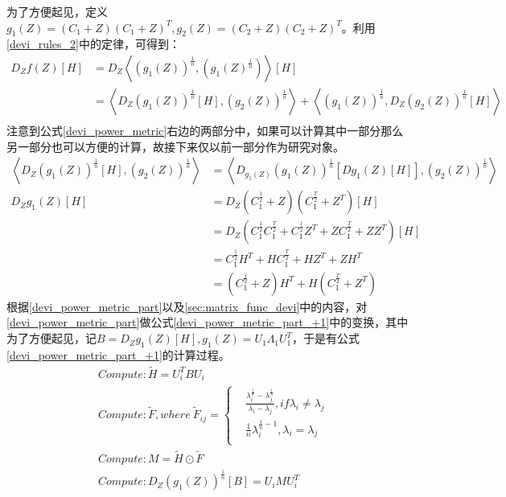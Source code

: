 为了方便起见，定义$g_{1}(Z)=(C_1+Z)(C_1+Z)^{T},g_{2}(Z)=(C_2+Z)(C_2+Z)^{T}$。利用\ref{devi_rules_2}中的定律，可得到：
\begin{equation}
\label{devi_power_metric}
\begin{split}
D_{Z}f(Z)[H]&=D_{Z}\left<\left(g_{1}(Z)\right)^{\frac{1}{n}},\left(g_{1}(Z)^{\frac{1}{n}}\right)\right>[H]\\
&=\left<D_{Z}\left(g_{1}(Z)\right)^{\frac{1}{n}}[H],\left(g_{2}(Z)\right)^{\frac{1}{n}}\right>+\left<\left(g_{1}(Z)\right)^{\frac{1}{n}},D_{Z}\left(g_{2}(Z)\right)^{\frac{1}{n}}[H]\right>\\
\end{split}
\end{equation}
注意到公式\ref{devi_power_metric}右边的两部分中，如果可以计算其中一部分那么另一部分也可以方便的计算，故接下来仅以前一部分作为研究对象。
\begin{equation}
\label{devi_power_metric_part}
\begin{split}
\left<D_{Z}\left(g_{1}(Z)\right)^{\frac{1}{n}}[H],\left(g_{2}(Z)\right)^{\frac{1}{n}}\right>&=\left<D_{g_{1}(Z)}\left(g_{1}(Z)\right)^{\frac{1}{n}}[Dg_{1}(Z)[H]],\left(g_{2}(Z)\right)^{\frac{1}{n}}\right>\\
D_{Z}g_{1}(Z)[H]&=D_{Z}(C_{1}^{\frac{1}{2}}+Z)(C_{1}^{\frac{T}{2}}+Z^{T})[H]\\
&=D_{Z}(C_{1}^{\frac{1}{2}}C_{1}^{\frac{T}{2}}+C_{1}^{\frac{1}{2}}Z^{T}+ZC_{1}^{\frac{T}{2}}+ZZ^{T})[H]\\
&=C_{1}^{\frac{1}{2}}H^{T}+HC_{1}^{\frac{T}{2}}+HZ^{T}+ZH^{T}\\
&=(C_{1}^{\frac{1}{2}}+Z)H^{T}+H(C_{1}^{\frac{T}{2}}+Z^{T})
\end{split}
\end{equation}
根据\ref{devi_power_metric_part}以及\ref{sec:matrix_func_devi}中的内容，对\ref{devi_power_metric_part}做公式\ref{devi_power_metric_part_+1}中的变换，其中为了方便起见，记$B=D_{Z}g_{1}(Z)[H],g_{1}(Z)=U_{1}\Lambda_{1}U_{1}^{T}$，于是有公式\ref{devi_power_metric_part_+1}的计算过程。
\begin{equation}
\label{devi_power_metric_part_+1}
\begin{split}
&Compute:\tilde{H}=U_{i}^{T}BU_{i}\\
&Compute:\tilde{F},where~\tilde{F}_{ij}=\left\{
\begin{split}
&\frac{\lambda_{i}^{\frac{1}{n}}-\lambda_{j}^{\frac{1}{n}}}{\lambda_{i}-\lambda_{j}},if \lambda_{i}\neq \lambda_{j}\\
&\frac{1}{n}\lambda_{i}^{\frac{1}{n}-1},\lambda_{i}=\lambda_{j}\\
\end{split}
\right.\\
&Compute:M=\tilde{H}\odot\tilde{F}\\
&Compute:D_{Z}\left(g_{1}(Z)\right)^{\frac{1}{n}}[B]=U_{i}MU_{i}^{T}
\end{split}
\end{equation}
